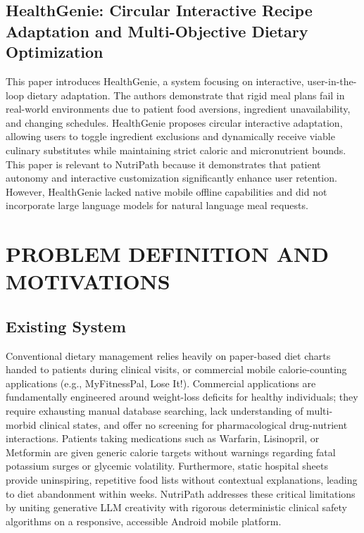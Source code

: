 \documentclass[a4paper,12pt]{report}
\begin{document}
\section{HealthGenie: Circular Interactive Recipe Adaptation and Multi-Objective Dietary Optimization}

\hspace{1cm}This paper introduces HealthGenie, a system focusing on interactive, user-in-the-loop dietary adaptation. The authors demonstrate that rigid meal plans fail in real-world environments due to patient food aversions, ingredient unavailability, and changing schedules. HealthGenie proposes circular interactive adaptation, allowing users to toggle ingredient exclusions and dynamically receive viable culinary substitutes while maintaining strict caloric and micronutrient bounds. This paper is relevant to NutriPath because it demonstrates that patient autonomy and interactive customization significantly enhance user retention. However, HealthGenie lacked native mobile offline capabilities and did not incorporate large language models for natural language meal requests. \cite{three}

\chapter{PROBLEM DEFINITION AND MOTIVATIONS}

\section{Existing System}

Conventional dietary management relies heavily on paper-based diet charts handed to patients during clinical visits, or commercial mobile calorie-counting applications (e.g., MyFitnessPal, Lose It!). Commercial applications are fundamentally engineered around weight-loss deficits for healthy individuals; they require exhausting manual database searching, lack understanding of multi-morbid clinical states, and offer no screening for pharmacological drug-nutrient interactions. Patients taking medications such as Warfarin, Lisinopril, or Metformin are given generic calorie targets without warnings regarding fatal potassium surges or glycemic volatility. Furthermore, static hospital sheets provide uninspiring, repetitive food lists without contextual explanations, leading to diet abandonment within weeks. NutriPath addresses these critical limitations by uniting generative LLM creativity with rigorous deterministic clinical safety algorithms on a responsive, accessible Android mobile platform.
\end{document}
